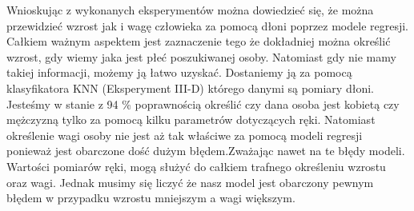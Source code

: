 \documentclass{article}
\begin{document}
Wnioskując z wykonanych eksperymentów można dowiedzieć się, że można przewidzieć wzrost jak i wagę
człowieka za pomocą dłoni poprzez modele regresji. Całkiem ważnym aspektem jest zaznaczenie tego że
dokładniej można określić wzrost, gdy wiemy jaka jest płeć poszukiwanej osoby. Natomiast gdy nie mamy takiej informacji, możemy ją łatwo uzyskać. Dostaniemy ją za pomocą klasyfikatora KNN (Eksperyment III-D) którego danymi są pomiary dłoni. Jesteśmy w stanie z 94 \% poprawnością określić czy dana osoba jest kobietą czy mężczyzną tylko za pomocą kilku parametrów dotyczących ręki. Natomiast określenie wagi osoby nie jest aż tak właściwe za pomocą modeli regresji ponieważ jest obarczone dość dużym błędem.Zważając nawet na te błędy modeli. Wartości pomiarów ręki, mogą służyć do całkiem trafnego określeniu wzrostu oraz wagi. Jednak musimy się liczyć że nasz model jest obarczony pewnym błędem w przypadku wzrostu mniejszym a wagi większym.
\end{document}
